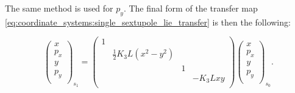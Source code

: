 The same method is used for $p_y$.
The final form of the transfer map \cref{eq:coordinate_systems:single_sextupole_lie_transfer} is
then the following:

\begin{equation}
    \begin{pmatrix}
        x \\
        p_x \\
        y \\
        p_y \\
    \end{pmatrix}_{s_1}
    =
    \begin{pmatrix}
        1 &  &  &  \\
         & \frac{1}{2}K_3L(x^2-y^2) &  & \\
         & & 1 & \\
         & &  & -K_3Lxy\\ 
    \end{pmatrix}
    \begin{pmatrix}
        x \\
        p_x \\
        y \\
        p_y \\
    \end{pmatrix}_{s_0}.
\end{equation}

